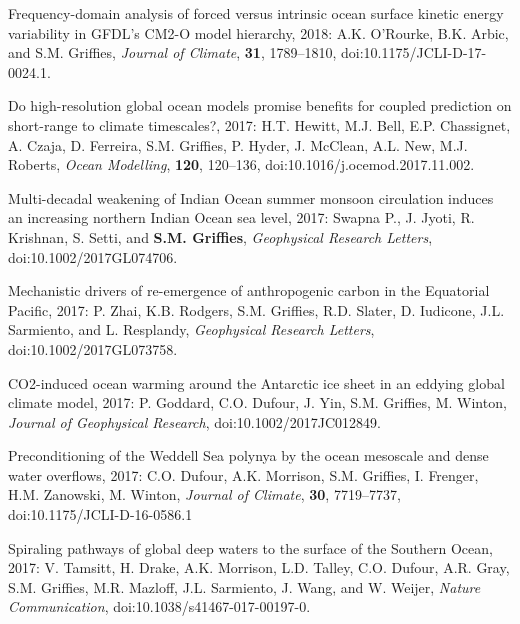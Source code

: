 \begin{etaremune}
\item Frequency-domain analysis of forced versus intrinsic ocean surface kinetic energy variability in GFDL's CM2-O model hierarchy, 2018: A.K. O'Rourke, B.K. Arbic, and S.M. Grif\/f\/ies, {\it Journal of Climate}, {\bf 31}, 1789--1810, doi:10.1175/JCLI-D-17-0024.1.

\item Do high-resolution global ocean models promise benefits for coupled prediction on short-range to climate timescales?, 2017: H.T. Hewitt, M.J. Bell, E.P. Chassignet, A. Czaja, D. Ferreira, S.M. Grif\/f\/ies, P. Hyder, J. McClean, A.L. New, M.J. Roberts, {\it Ocean Modelling}, {\bf 120}, 120--136, doi:10.1016/j.ocemod.2017.11.002.

\item Multi-decadal weakening of Indian Ocean summer monsoon circulation induces an increasing northern Indian Ocean sea level, 2017: Swapna P., J. Jyoti, R. Krishnan, S. Setti, and {\bf  S.M. Grif\/f\/ies}, {\it Geophysical Research  Letters}, \newline doi:10.1002/2017GL074706.



\item Mechanistic drivers of re-emergence of anthropogenic carbon in the Equatorial Pacific, 2017: P. Zhai, K.B. Rodgers, S.M. Grif\/fies, R.D. Slater, D. Iudicone, J.L. Sarmiento, and L. Resplandy, {\it Geophysical Research Letters}, doi:10.1002/2017GL073758.

\item CO2-induced ocean warming around the Antarctic ice sheet in an eddying global climate model, 2017: P. Goddard, C.O. Dufour, J. Yin, S.M. Grif\/f\/ies, M. Winton, {\it Journal of Geophysical Research}, doi:10.1002/2017JC012849. 

\item Preconditioning of the Weddell Sea polynya by the ocean mesoscale and dense water overflows, 2017: C.O. Dufour, A.K. Morrison, S.M. Grif\/f\/ies, I. Frenger, H.M. Zanowski, M. Winton, {\it Journal of Climate}, {\bf 30}, 7719--7737, doi:10.1175/JCLI-D-16-0586.1

\item Spiraling pathways of global deep waters to the surface of the Southern Ocean, 2017: V. Tamsitt, H.  Drake, A.K. Morrison, L.D. Talley, C.O. Dufour, A.R. Gray, S.M. Grif\/f\/ies, M.R. Mazloff, J.L. Sarmiento, J. Wang, and W. Weijer, {\it Nature Communication}, doi:10.1038/s41467-017-00197-0.


\end{etaremune}
